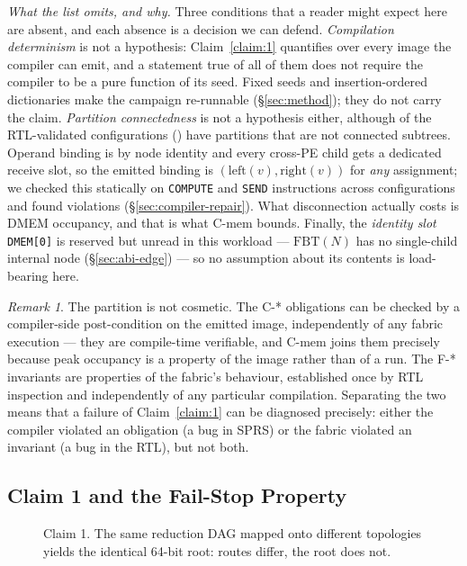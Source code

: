\documentclass[journal,10pt]{IEEEtran}
\theoremstyle{plain}
\theoremstyle{definition}
\theoremstyle{remark}
\newtheorem*{remark}{Remark}
\newcommand{\FBT}{\ensuremath{\mathrm{FBT}}}
\newcommand{\sprs}{\textsc{SPRS}}
\begin{document}
\emph{What the list omits, and why.} Three conditions that a reader might
expect here are absent, and each absence is a decision we can defend.
\emph{Compilation determinism} is not a hypothesis: Claim~\ref{claim:1}
quantifies over every image the compiler can emit, and a statement true of
all of them does not require the compiler to be a pure function of its
seed. Fixed seeds and insertion-ordered dictionaries make the campaign
re-runnable (\S\ref{sec:method}); they do not carry the claim.
\emph{Partition connectedness} is not a hypothesis either, although
\DisconnCount{} of the RTL-validated configurations (\DisconnShare{})
have partitions that are not connected subtrees. Operand binding is by
node identity and every cross-PE child gets a dedicated receive slot, so
the emitted binding is $(\mathrm{left}(v), \mathrm{right}(v))$ for
\emph{any} assignment; we checked this statically on \BindComputes{}
\texttt{COMPUTE} and \BindSends{} \texttt{SEND} instructions across
\BindConfigs{} configurations and found \BindViolations{} violations
(\S\ref{sec:compiler-repair}). What disconnection actually costs is DMEM
occupancy, and that is what \textsf{C-mem} bounds. Finally, the
\emph{identity slot} \texttt{DMEM[0]} is reserved but unread in this
workload --- $\FBT(N)$ has no single-child internal node
(\S\ref{sec:abi-edge}) --- so no assumption about its contents is
load-bearing here.

\begin{remark}
The partition is not cosmetic. The \textsf{C-*} obligations can be checked
by a compiler-side post-condition on the emitted image, independently of
any fabric execution --- they are compile-time verifiable, and
\textsf{C-mem} joins them precisely because peak occupancy is a property
of the image rather than of a run. The \textsf{F-*} invariants are
properties of the fabric's behaviour, established once by RTL inspection
and independently of any particular compilation. Separating the two means
that a failure of Claim~\ref{claim:1} can be diagnosed precisely: either
the compiler violated an obligation (a bug in \sprs{}) or the fabric
violated an invariant (a bug in the RTL), but not both.
\end{remark}

\subsection{Claim 1 and the Fail-Stop Property}\label{sec:abi-claim}

\begin{figure}[!t]\centering

\caption{Claim 1. The same reduction DAG mapped onto different topologies yields the identical 64-bit root: routes differ, the root does not.}\label{fig:claim1}
\end{figure}
\end{document}
